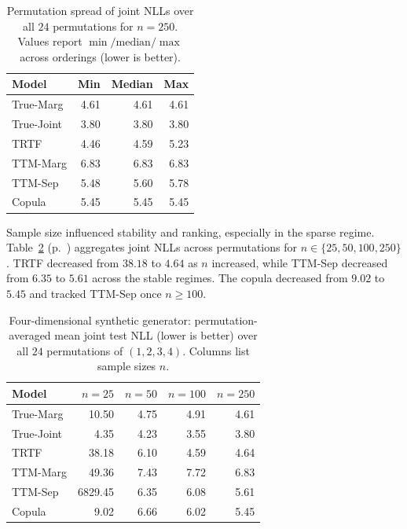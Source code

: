 \documentclass[11pt,a4paper,twoside]{book}\usepackage[]{graphicx}\usepackage[]{xcolor}
\begin{document}
\begin{table}[htbp]
 \centering
 \caption{Permutation spread of joint NLLs over all $24$ permutations for $n=250$. Values report $\min/\mathrm{median}/\max$ across orderings (lower is better).}
 \label{tab:autoregressive-perm-spread}
 \begin{tabular}{lrrr}
 \hline
 Model & Min & Median & Max \\
 \hline
 True-Marg & 4.61 & 4.61 & 4.61 \\
 True-Joint & 3.80 & 3.80 & 3.80 \\
 TRTF & 4.46 & 4.59 & 5.23 \\
 TTM-Marg & 6.83 & 6.83 & 6.83 \\
 TTM-Sep & 5.48 & 5.60 & 5.78 \\
 Copula & 5.45 & 5.45 & 5.45 \\
 \hline
 \end{tabular}
\end{table}

Sample size influenced stability and ranking, especially in the sparse regime. Table~\ref{tab:autoregressive-perm-avg} (p.~\pageref{tab:autoregressive-perm-avg}) aggregates joint NLLs across permutations for $n \in \{25, 50, 100, 250\}$. TRTF decreased from $38.18$ to $4.64$ as $n$ increased, while TTM-Sep decreased from $6.35$ to $5.61$ across the stable regimes. The copula decreased from $9.02$ to $5.45$ and tracked TTM-Sep once $n \ge 100$.

\begin{table}[htbp]
 \centering
 \caption{Four-dimensional synthetic generator: permutation-averaged mean joint test NLL (lower is better) over all $24$ permutations of $(1,2,3,4)$. Columns list sample sizes $n$.}
 \label{tab:autoregressive-perm-avg}
 \begin{tabular}{lrrrr}
 \hline
 Model & $n=25$ & $n=50$ & $n=100$ & $n=250$ \\
 \hline
 True-Marg & 10.50 & 4.75 & 4.91 & 4.61 \\
 True-Joint & 4.35 & 4.23 & 3.55 & 3.80 \\
 TRTF & 38.18 & 6.10 & 4.59 & 4.64 \\
 TTM-Marg & 49.36 & 7.43 & 7.72 & 6.83 \\
 TTM-Sep & 6829.45 & 6.35 & 6.08 & 5.61 \\
 Copula & 9.02 & 6.66 & 6.02 & 5.45 \\
 \hline
 \end{tabular}
\end{table}
\end{document}
